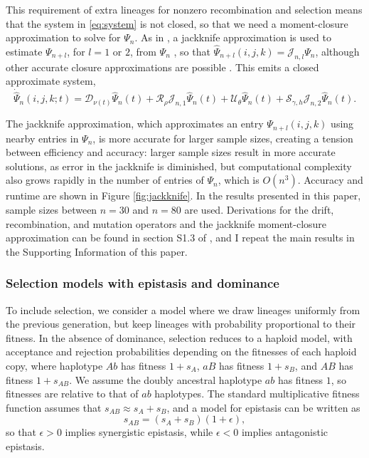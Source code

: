 \documentclass[]{article}
\begin{document}
This requirement of extra lineages for nonzero recombination and selection
means that the system in \eqref{eq:system} is not closed, so that we need a
moment-closure approximation to solve for \(\Psi_n\). As in \citet{Ragsdale2019-nt}, a
jackknife approximation is used to estimate \(\Psi_{n+l}\), for \(l=1\) or \(2\),
from \(\Psi_n\) \citep[following the single-locus closure introduced in][]{Jouganous2017-pq}, so that \(\hat{\Psi}_{n+l}(i, j, k) = \mathcal{J}_{n, l}\Psi_n\), although other accurate closure approximations are possible
\citep{Friedlander2021-bs}. This emits a closed approximate system,
\begin{equation}
\label{eq:closed-system}
\dot{\hat\Psi}_n(i, j, k; t) =
\mathcal{D}_{\nu(t)}\hat\Psi_n(t)
+ \mathcal{R}_{\rho}\mathcal{J}_{n, 1}\hat\Psi_{n}(t)
+ \mathcal{U}_{\theta}\hat\Psi_n(t)
+ \mathcal{S}_{\gamma, h}\mathcal{J}_{n, 2}\hat\Psi_{n}(t).
\end{equation}

The jackknife approximation, which approximates an entry \(\Psi_{n+l}(i,j,k)\)
using nearby entries in \(\Psi_n\), is more accurate for larger sample sizes,
creating a tension between efficiency and accuracy: larger sample sizes result
in more accurate solutions, as error in the jackknife is diminished, but
computational complexity also grows rapidly in the number of entries of
\(\Psi_n\), which is \(O(n^3)\). Accuracy and runtime are shown in Figure
\ref{fig:jackknife}. In the results presented in this paper, sample sizes
between \(n=30\) and \(n=80\) are used. Derivations for the drift, recombination,
and mutation operators and the jackknife moment-closure approximation can be
found in section S1.3 of \citet{Ragsdale2019-nt}, and I repeat the main results in the
Supporting Information of this paper.

\subsubsection{Selection models with epistasis and dominance}
\label{selection-models-with-epistasis-and-dominance}

To include selection, we consider a model where we draw lineages uniformly from
the previous generation, but keep lineages with probability proportional to
their fitness. In the absence of dominance, selection reduces to a haploid
model, with acceptance and rejection probabilities depending on the fitnesses
of each haploid copy, where haplotype \(Ab\) has fitness \(1 + s_{A}\), \(aB\) has
fitness \(1 + s_{B}\), and \(AB\) has fitness \(1 + s_{AB}\). We assume the doubly
ancestral haplotype \(ab\) has fitness \(1\), so fitnesses are relative to that of
\(ab\) haplotypes. The standard multiplicative fitness function assumes that
\(s_{AB} \approx s_{A} + s_{B}\), and a model for epistasis can be written as
\[s_{AB} = (s_{A} + s_{B}) (1 + \epsilon),\] so that \(\epsilon > 0\) implies
synergistic epistasis, while \(\epsilon < 0\) implies antagonistic epistasis.
\end{document}
